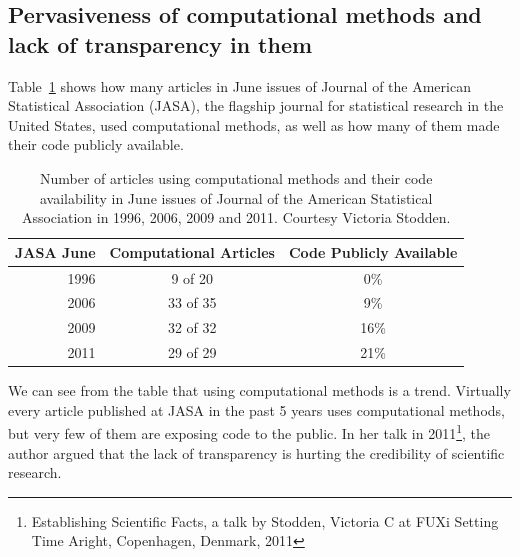 \subsection{Pervasiveness of computational methods and lack of transparency in them}
Table~\ref{table:jasa} shows how many articles in June issues of Journal of the American Statistical Association (JASA), the flagship journal for statistical research in the United States, used computational methods, as well as how many of them made their code publicly available.
\begin{table}
	\centering
	\caption[Computational methods and code availability of JASA]{Number of articles using computational methods and their code availability in June issues of Journal of the American Statistical Association in 1996, 2006, 2009 and 2011. Courtesy Victoria Stodden.}
	\label{table:jasa}
	\begin{tabular}{r|cc}
		JASA June & Computational Articles & Code Publicly Available \\ 
		\hline 1996 & 9 of 20 & 0\% \\ 
		 2006 & 33 of 35 & 9\% \\ 
		 2009 & 32 of 32 & 16\% \\ 
		 2011 & 29 of 29 & 21\% \\  
	\end{tabular} 
\end{table}
We can see from the table that using computational methods is a trend. Virtually every article published at JASA in the past 5 years uses computational methods, but very few of them are exposing code to the public.
In her talk in 2011\footnote{Establishing Scientific Facts, a talk by Stodden, Victoria C at FUXi Setting Time Aright, Copenhagen, Denmark, 2011}, the author argued that the lack of transparency is hurting the credibility of scientific research.

